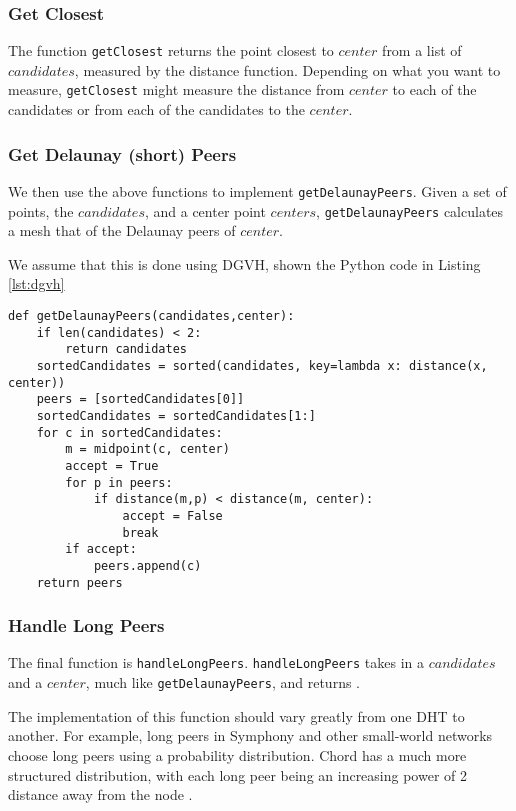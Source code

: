 \documentclass[11pt,conference]{IEEEtran}
\begin{document}
\subsubsection{Get Closest}
The function \texttt{getClosest} returns the point closest to $ center$ from a list of $ candidates$, measured by the distance function.
Depending on what you want to measure, \texttt{getClosest} might measure the distance from $ center$ to each of the candidates or from each of the candidates to the $ center$.

\subsubsection{Get Delaunay (short) Peers}
We then use the above functions to implement  \texttt{getDelaunayPeers}.
Given a set of points, the $ candidates$, and a center point $ centers$, \texttt{getDelaunayPeers} calculates a mesh that of the Delaunay peers of $ center$.

We assume that this is done using DGVH, shown the Python code 
in Listing \ref{lst:dgvh}


\begin{lstlisting}[basicstyle=\footnotesize\ttfamily,  breaklines=true, caption={\texttt{getDelaunayPeers()}}, label={lst:dgvh}, frame=single] 
def getDelaunayPeers(candidates,center):    
	if len(candidates) < 2:
		return candidates
	sortedCandidates = sorted(candidates, key=lambda x: distance(x, center))
	peers = [sortedCandidates[0]] 
	sortedCandidates = sortedCandidates[1:]
	for c in sortedCandidates:
		m = midpoint(c, center)
		accept = True
		for p in peers:
			if distance(m,p) < distance(m, center):  
				accept = False
				break
		if accept:
			peers.append(c)
	return peers
\end{lstlisting}


\subsubsection{Handle Long Peers}

The final function is \texttt{handleLongPeers}.
\texttt{handleLongPeers} takes in a $ candidates $ and a $ center$, much like \texttt{getDelaunayPeers}, and returns .

The implementation of this function should vary greatly from one DHT to another.
For example, long peers in Symphony \cite{symphony} and other small-world \cite{kleinberg2000navigation} networks choose long peers using a probability distribution.
Chord has a much more structured distribution, with each long peer being an increasing power of 2 distance away from the node \cite{chord}.
\end{document}
